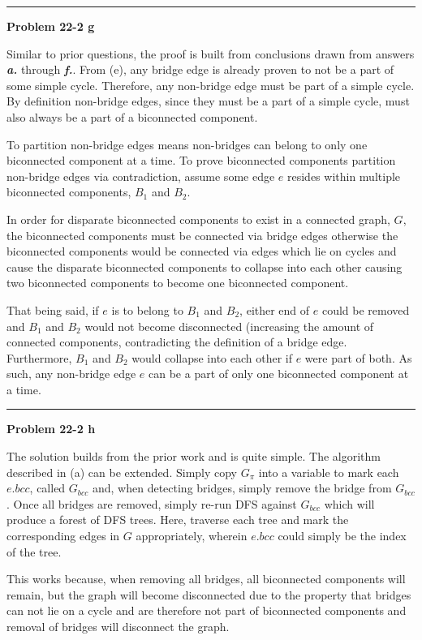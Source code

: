 \documentclass{article}
\newcommand\separator{\rule{\textwidth}{.2pt}}  %
\begin{document}
\separator

\textbf{Problem 22-2 g} 

Similar to prior questions, the proof is built from conclusions drawn from 
answers \textbf{\textit{a.}} through \textbf{\textit{f.}}. From (e), any bridge
edge is already proven to not be a part of some simple cycle. Therefore, any 
non-bridge edge must be part of a simple cycle. By definition non-bridge edges,
since they must be a part of a simple cycle, must also always be a part of a 
biconnected component. 

To partition non-bridge edges means non-bridges can belong to only one 
biconnected component at a time. To prove biconnected components partition 
non-bridge edges via contradiction, assume some edge $e$ resides within multiple
biconnected components, $B_1$ and $B_2$. 

In order for disparate biconnected components to exist in a connected graph, 
$G$, the biconnected components must be connected via bridge edges otherwise the
biconnected components would be connected via edges which lie on cycles and 
cause the disparate biconnected components to collapse into each other causing
two biconnected components to become one biconnected component. 

That being said, if $e$ is to belong to $B_1$ and $B_2$, either end of $e$ could
be removed and $B_1$ and $B_2$ would not become disconnected (increasing the 
amount of connected components, contradicting the definition of a bridge edge. 
Furthermore, $B_1$ and $B_2$ would collapse into each other if $e$ were part of
both. As such, any non-bridge edge $e$ can be a part of only one biconnected 
component at a time. 

\separator

\textbf{Problem 22-2 h} 

The solution builds from the prior work and is quite simple. The algorithm 
described in (a) can be extended. Simply copy $G_\pi$ into a variable to mark 
each $e.bcc$, called $G_{bcc}$ and, when detecting bridges, simply remove the 
bridge from $G_{bcc}$. Once all bridges are removed, simply re-run DFS against
$G_{bcc}$ which will produce a forest of DFS trees. Here, traverse each tree and 
mark the corresponding edges in $G$ appropriately, wherein $e.bcc$ could simply
be the index of the tree. 

This works because, when removing all bridges, all biconnected components will 
remain, but the graph will become disconnected due to the property that bridges
can not lie on a cycle and are therefore not part of biconnected components and
removal of bridges will disconnect the graph. 
\end{document}
